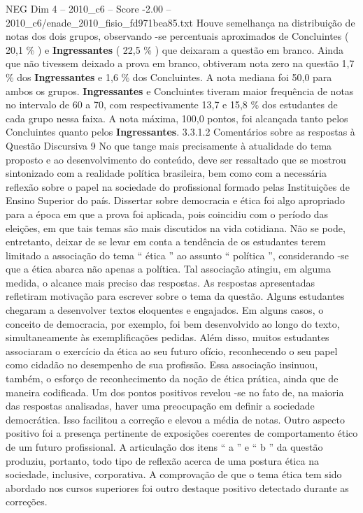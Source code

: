 \begin{textsample}{NEG Dim 4 – 2010\_c6 – Score -2.00 – 2010\_c6/enade\_2010\_fisio\_fd971bea85.txt}
Houve semelhança na distribuição de notas dos dois grupos, observando -se percentuais aproximados de Concluintes ( 20,1 \% ) e \textbf{Ingressantes} ( 22,5 \% ) que deixaram a questão em branco.
Ainda que não tivessem deixado a prova em branco, obtiveram nota zero na questão 1,7 \% dos \textbf{Ingressantes} e 1,6 \% dos Concluintes.
A nota mediana foi 50,0 para ambos os grupos. \textbf{Ingressantes} e Concluintes tiveram maior frequência de notas no intervalo de 60 a 70, com respectivamente 13,7 e 15,8 \% dos estudantes de cada grupo nessa faixa.
A nota máxima, 100,0 pontos, foi alcançada tanto pelos Concluintes quanto pelos \textbf{Ingressantes}. 3.3.1.2 Comentários sobre as respostas à Questão Discursiva 9 No que tange mais precisamente à atualidade do tema proposto e ao desenvolvimento do conteúdo, deve ser ressaltado que se mostrou sintonizado com a realidade política brasileira, bem como com a necessária reflexão sobre o papel na sociedade do profissional formado pelas Instituições de Ensino Superior do país.
Dissertar sobre democracia e ética foi algo apropriado para a época em que a prova foi aplicada, pois coincidiu com o período das eleições, em que tais temas são mais discutidos na vida cotidiana.
Não se pode, entretanto, deixar de se levar em conta a tendência de os estudantes terem limitado a associação do tema “ ética ” ao assunto “ política ”, considerando -se que a ética abarca não apenas a política.
Tal associação atingiu, em alguma medida, o alcance mais preciso das respostas.
As respostas apresentadas refletiram motivação para escrever sobre o tema da questão.
Alguns estudantes chegaram a desenvolver textos eloquentes e engajados.
Em alguns casos, o conceito de democracia, por exemplo, foi bem desenvolvido ao longo do texto, simultaneamente às exemplificações pedidas.
Além disso, muitos estudantes associaram o exercício da ética ao seu futuro ofício, reconhecendo o seu papel como cidadão no desempenho de sua profissão.
Essa associação insinuou, também, o esforço de reconhecimento da noção de ética prática, ainda que de maneira codificada.
Um dos pontos positivos revelou -se no fato de, na maioria das respostas analisadas, haver uma preocupação em definir a sociedade democrática.
Isso facilitou a correção e elevou a média de notas.
Outro aspecto positivo foi a presença pertinente de exposições coerentes de comportamento ético de um futuro profissional.
A articulação dos itens “ a ” e “ b ” da questão produziu, portanto, todo tipo de reflexão acerca de uma postura ética na sociedade, inclusive, corporativa.
A comprovação de que o tema ética tem sido abordado nos cursos superiores foi outro destaque positivo detectado durante as correções.

\end{textsample}
